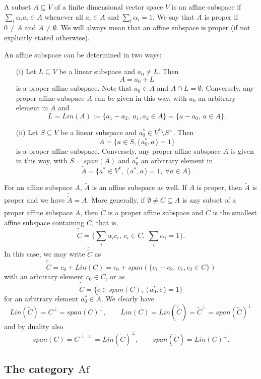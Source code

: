 \documentclass[12pt]{article}
\theoremstyle{definition}
\theoremstyle{remark}
\def\<{\langle\,}
\def\>{\,\rangle}
\def \Af{\mathrm{Af}}
\begin{document}
A subset $A\subseteq V$ of a finite dimensional vector space $V$ is an affine subspace if 
$\sum_i\alpha_i a_i\in A$ whenever all $a_i\in A$ and $\sum_i\alpha_i=1$. We say that $A$
is proper if $0\ne A$ and $A\ne \emptyset$. We will always
mean  that an affine subspace is proper (if not explicitly stated otherwise).

An affine
subspace can be determined in two ways:
\begin{enumerate}
\item[(i)] Let $L\subseteq V$ be a linear subspace and $a_0\ne L$. Then 
\[
A=a_0+L
\]
is a proper affine subspace.  Note that $a_0\in A$ and $A\cap L=\emptyset$.
Conversely, any proper affine subspace $A$ can be given in this way, with $a_0$ an arbitrary element in $A$ and
\[
L=Lin(A):=\{a_1-a_2,\ a_1,a_2\in A\}=\{a-a_0,\ a\in A\}.
\]
\item[(ii)] Let $S\subseteq V$ be a linear subspace and $a_0^*\in V^*\setminus S^\perp$. Then
\[
A=\{a\in S, \<a_0^*,a\>=1\}
\]
is a proper affine subspace. Conversely, any proper affine subspace $A$ is given in this way, with
$S=span(A)$ and $a_0^*$ an arbitrary element in 
\[
\tilde A=\{a^*\in V^*,\ \<a^*,a\>=1,\ \forall a\in A\}.
\]
\end{enumerate}

For an affine subspace $A$, $\tilde A$ is an affine subspace as well. If $A$ is proper,
then $\tilde A$ is proper and we have
$\tilde{\tilde A}=A$. More generally, if $\emptyset\ne C\subseteq A$ is any  subset of a
proper  affine
subspace $A$, then $\tilde C$ is a proper affine subspace 
and $\tilde{\tilde C}$ is the smallest
affine subspace containing $C$, that is,
\[
\tilde{\tilde C}=\{\sum_i \alpha_i c_i,\ c_i\in C,\ \sum_i\alpha_i=1\}.
\]
In this case, we may write $\tilde{\tilde C}$ as
\[
\tilde{\tilde C}=c_0+Lin(C)=c_0+span(\{c_1-c_2,\ c_1,c_2\in C\})
\]
with an arbitrary element $c_0\in C$, or as
\[
\tilde{\tilde C}=\{c\in span(C),\ \<a_0^*,c\>=1\}
\]
for an arbitrary element $a_0^*\in \tilde A$. We clearly have
\[
Lin(\tilde C)=C^\perp=span(C)^\perp,\qquad Lin(C)=Lin(\tilde{\tilde C})=\tilde
C^\perp=span(\tilde C)^\perp
\]
and by duality also
\[
span(C)=C^{\perp\perp} =Lin(\tilde C)^\perp,\qquad span(\tilde C)=Lin(C)^\perp.
\]





\subsection{The category $\Af$}
\end{document}
